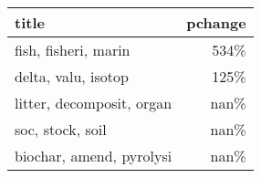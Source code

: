 \begin{tabular}{p{1.2cm}r}
\toprule
                     title &  pchange \\
\midrule
      fish, fisheri, marin &     534\% \\
       delta, valu, isotop &     125\% \\
 litter, decomposit, organ &     nan\% \\
          soc, stock, soil &     nan\% \\
  biochar, amend, pyrolysi &     nan\% \\
\bottomrule
\end{tabular}

